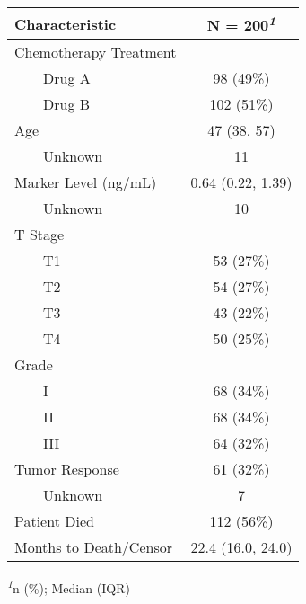 \setlength{\LTpost}{0mm}
\begin{longtable}{lc}
\toprule
\textbf{Characteristic} & \textbf{N = 200}\textsuperscript{\textit{1}} \\ 
\midrule\addlinespace[2.5pt]
Chemotherapy Treatment &  \\ 
    Drug A & 98 (49\%) \\ 
    Drug B & 102 (51\%) \\ 
Age & 47 (38, 57) \\ 
    Unknown & 11 \\ 
Marker Level (ng/mL) & 0.64 (0.22, 1.39) \\ 
    Unknown & 10 \\ 
T Stage &  \\ 
    T1 & 53 (27\%) \\ 
    T2 & 54 (27\%) \\ 
    T3 & 43 (22\%) \\ 
    T4 & 50 (25\%) \\ 
Grade &  \\ 
    I & 68 (34\%) \\ 
    II & 68 (34\%) \\ 
    III & 64 (32\%) \\ 
Tumor Response & 61 (32\%) \\ 
    Unknown & 7 \\ 
Patient Died & 112 (56\%) \\ 
Months to Death/Censor & 22.4 (16.0, 24.0) \\ 
\bottomrule
\end{longtable}
\begin{minipage}{\linewidth}
\textsuperscript{\textit{1}}n (\%); Median (IQR)\\
\end{minipage}

